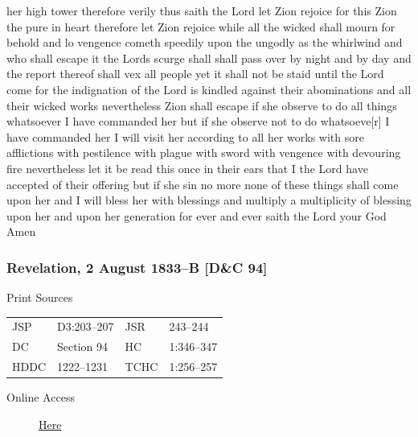 her high tower therefore verily thus saith the Lord let Zion rejoice for this Zion the pure in heart therefore let Zion rejoice while all the wicked shall mourn for behold and lo vengence cometh speedily upon the ungodly as the whirlwind and who shall escape it the Lords scurge shall shall pass over by night and by day and the report thereof shall vex all people yet it shall not be staid until the Lord come for the indignation of the Lord is kindled against their abominations and all their wicked works nevertheless Zion shall escape if she observe to do all things whatsoever I have commanded her but if she observe not to do whatsoeve[r] I have commanded her I will visit her according to all her works with sore afflictions with pestilence with plague with sword with vengence with devouring fire nevertheless let it be read this once in their ears that I the Lord have accepted of their offering but if she sin no more none of these things shall come upon her and I will bless her with blessings and multiply a multiplicity of blessing upon her and upon her generation for ever and ever saith the Lord your God Amen
				
		\subsubsection{Revelation, 2 August 1833--B [D\&C 94]}
			\label{EMS-1833-JS-2-AUG-1833-B}
		
			\begin{description}
				\item[Print Sources]
			\end{description}

				\begin{tabular}{p{0.5in}p{1in}p{0.5in}p{1in}}
				JSP	 	& D3:203--207		& JSR 		& 243--244 \\
				DC	 	& Section 94 		& HC 		& 1:346--347 \\
				HDDC 	& 1222--1231		& TCHC 		& 1:256--257 \\
				\end{tabular}
			
			\begin{description}
				\item[Online Access] \href{https://www.josephsmithpapers.org/paper-summary/revelation-2-august-1833-b-dc-94/1}{Here}
			\end{description}
			
